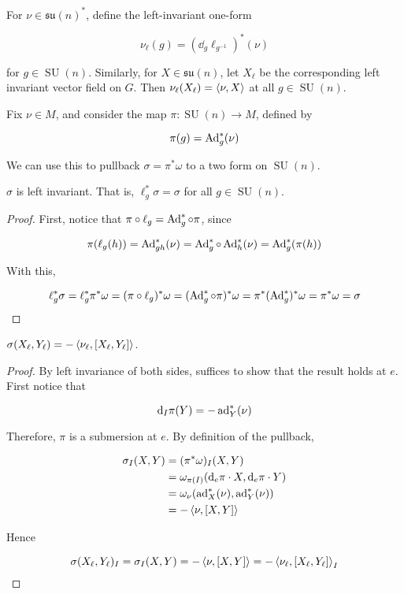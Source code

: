 \documentclass{article}
\DeclareMathOperator{\SU}{SU}
\newcommand{\su}{\mathfrak{su}}
\begin{document}
For \(\nu \in \su(n)^*\), define the left-invariant one-form

\[\nu_\ell(g) = (\dd_g\ell_{g^{-1}})^*(\nu)\]

for \(g \in \SU(n)\). Similarly, for \(X \in \su(n)\), let \(X_\ell\) be the corresponding left invariant vector field on \(G\). Then \(\nu_\ell(X_\ell) = \left\langle \nu, X \right\rangle\) at all \(g \in \SU(n)\).

Fix \(\nu \in  M\), and consider the map \(\pi : \SU(n) \to  M\), defined by

\[\pi(g) = \operatorname{Ad}_g^*(\nu)\]

We can use this to pullback \(\sigma = \pi^*\omega\) to a two form on \(\SU(n)\).

\begin{lemma}
    \label{lem:left-inv}
    \(\sigma\) is left invariant. That is, \(\ell_g^*\sigma = \sigma\) for all \(g \in \SU(n)\).
\end{lemma}

\begin{proof}
    First, notice that \(\pi \circ \ell_g = \operatorname{Ad}_g^* \circ \pi\), since

    \[\pi(\ell_g(h)) = \operatorname{Ad}_{gh}^*(\nu) = \operatorname{Ad}_g^*\circ \operatorname{Ad}_h^*(\nu) = \operatorname{Ad}_g^*(\pi(h))\]

    With this,

    \[\ell_g^*\sigma = \ell_g^*\pi^*\omega = (\pi\circ\ell_g)^*\omega = (\operatorname{Ad}_g^* \circ \pi)^*\omega = \pi^*(\operatorname{Ad}_g^*)^*\omega = \pi^*\omega = \sigma\]
\end{proof}

\begin{lemma}
    \(\sigma(X_\ell, Y_\ell) = -\left\langle \nu_\ell, [X_\ell, Y_\ell] \right\rangle\).
\end{lemma}

\begin{proof}
    By left invariance of both sides, suffices to show that the result holds at \(e\). First notice that

    \[\dd_I\pi(Y) = -\operatorname{ad}_Y^*(\nu)\]

    Therefore, \(\pi\) is a submersion at \(e\). By definition of the pullback,

    \begin{align*}
        \sigma_I(X, Y) &= (\pi^*\omega)_I(X, Y)\\ 
        &= \omega_{\pi(I)}(\dd_e\pi \cdot X, \dd_e\pi\cdot Y) \\
        &= \omega_\nu(\operatorname{ad}_X^*(\nu), \operatorname{ad}_Y^*(\nu)) \\
        &= -\left\langle \nu, [X, Y] \right\rangle
    \end{align*}

    Hence

    \[\sigma(X_\ell, Y_\ell)_I = \sigma_I(X, Y) = -\left\langle \nu, [X, Y] \right\rangle = -\left\langle \nu_\ell, [X_\ell, Y_\ell] \right\rangle_I\]
\end{proof}
\end{document}

